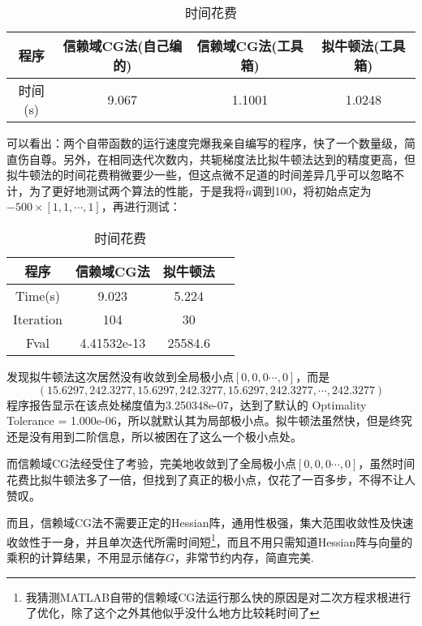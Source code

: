 \begin{table}[htbp]
  \centering
 \caption{时间花费}
    \begin{tabular}{cccc}
    \toprule
    程序&信赖域CG法(自己编的)&信赖域CG法(工具箱)&拟牛顿法(工具箱)\\
     \midrule
    时间(s)&9.067 &1.1001&1.0248\\
    \bottomrule
    \end{tabular}%
  \label{tab:addlabe3}%
\end{table}%

可以看出：两个自带函数的运行速度完爆我亲自编写的程序，快了一个数量级，简直伤自尊。另外，在相同迭代次数内，共轭梯度法比拟牛顿法达到的精度更高，但拟牛顿法的时间花费稍微要少一些，但这点微不足道的时间差异几乎可以忽略不计，为了更好地测试两个算法的性能，于是我将$n$调到100，将初始点定为$-500\times[1,1,\cdots,1]$，再进行测试：

\begin{table}[htbp]
  \centering
 \caption{时间花费}
    \begin{tabular}{cccc}
    \toprule
    程序&信赖域CG法&拟牛顿法\\
     \midrule
    Time(s) &9.023&5.224\\
    Iteration&104&30\\
    Fval&4.41532e-13&25584.6\\
    \bottomrule
    \end{tabular}%
  \label{tab:addlabe3}%
\end{table}%

发现拟牛顿法这次居然没有收敛到全局极小点$[0,0,0\cdots,0]$，而是\[(15.6297,242.3277,15.6297,242.3277,15.6297,242.3277,\cdots,242.3277)\] 
程序报告显示在该点处梯度值为3.250348e-07，达到了默认的 Optimality Tolerance = 1.000e-06，所以就默认其为局部极小点。拟牛顿法虽然快，但是终究还是没有用到二阶信息，所以被困在了这么一个极小点处。

而信赖域CG法经受住了考验，完美地收敛到了全局极小点$[0,0,0\cdots,0]$，虽然时间花费比拟牛顿法多了一倍，但找到了真正的极小点，仅花了一百多步，不得不让人赞叹。

而且，信赖域CG法不需要正定的Hessian阵，通用性极强，集大范围收敛性及快速收敛性于一身，并且单次迭代所需时间短\footnote{我猜测MATLAB自带的信赖域CG法运行那么快的原因是对二次方程求根进行了优化，除了这个之外其他似乎没什么地方比较耗时间了}，而且不用只需知道Hessian阵与向量的乘积的计算结果，不用显示储存$G$，非常节约内存，简直完美.